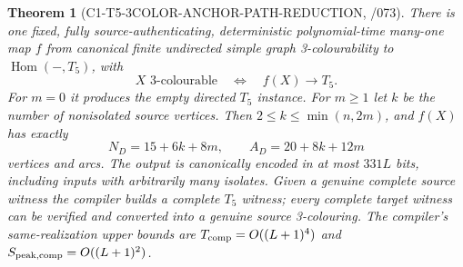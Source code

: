 \documentclass[11pt]{article}
\newtheorem{theorem}{Theorem}
\begin{document}
\begin{theorem}[C1-T5-3COLOR-ANCHOR-PATH-REDUCTION, /073]
There is one fixed, fully source-authenticating, deterministic
polynomial-time many-one map $f$ from canonical finite undirected
simple graph 3-colourability to $\operatorname{Hom}(-,T_5)$, with
\[
 X\text{ 3-colourable}\quad\Longleftrightarrow\quad
 f(X)\longrightarrow T_5.
\]
For $m=0$ it produces the empty directed $T_5$ instance. For
$m\ge1$ let $k$ be the number of nonisolated source vertices.
Then $2\le k\le\min(n,2m)$, and $f(X)$ has exactly
\[
 \boxed{N_D=15+6k+8m,\qquad A_D=20+8k+12m}
\]
vertices and arcs. The output is canonically encoded in at most
$331L$ bits, including inputs with arbitrarily many isolates.
Given a genuine complete source witness the compiler builds a
complete $T_5$ witness; every complete target witness can be
verified and converted into a genuine source 3-colouring.
The compiler's same-realization upper bounds are
$T_{\rm comp}=O((L+1)^4)$ and
$S_{\rm peak,comp}=O((L+1)^2)$.
\end{theorem}
\end{document}
